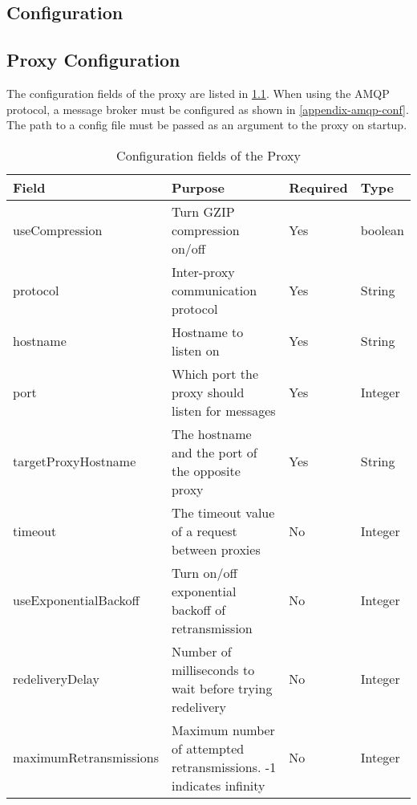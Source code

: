 \begin{appendices}

\chapter{Configuration}
\label{appendix-config}

\section{Proxy Configuration}

The configuration fields of the proxy are listed in
\cref{appendix-table-config}. When using the AMQP protocol, a message broker
must be configured as shown in \cref{appendix-amqp-conf}. The path to a config
file must be passed as an argument to the proxy on startup.


\begin{table}[h]
\begin{tabularx}{\textwidth}{|l|X|l|l|}
    \hline
    \textbf{Field}         & \textbf{Purpose}                                                   & \textbf{Required} & \textbf{Type} \\ \hline
    useCompression         & Turn GZIP compression on/off                                       & Yes               & boolean       \\ \hline
    protocol               & Inter-proxy communication protocol                                 & Yes               & String        \\ \hline
    hostname               & Hostname to listen on                                              & Yes               & String        \\ \hline
    port                   & Which port the proxy should listen for messages                    & Yes               & Integer       \\ \hline
    targetProxyHostname    & The hostname and the port of the opposite proxy                    & Yes               & String        \\ \hline
    timeout                & The timeout value of a request between proxies                     & No                & Integer       \\ \hline
    useExponentialBackoff  & Turn on/off exponential backoff of retransmission                 & No                & Integer       \\ \hline
    redeliveryDelay        & Number of milliseconds to wait before trying redelivery            & No                & Integer       \\ \hline
    maximumRetransmissions & Maximum number of attempted retransmissions. -1 indicates infinity & No                & Integer       \\ \hline
\end{tabularx}
\caption{Configuration fields of the Proxy}
\label{appendix-table-config}
\end{table}


\end{appendices}
